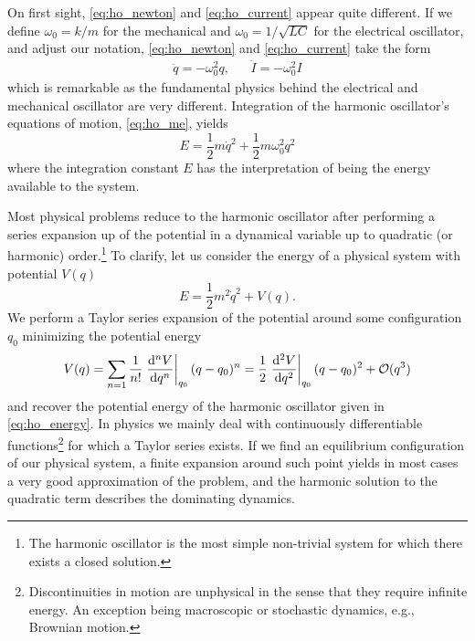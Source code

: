 On first sight, \cref{eq:ho_newton} and \cref{eq:ho_current} appear quite different.
If we define $\omega_0=k/m$ for the mechanical and $\omega_0=1/\sqrt{LC}$ for the electrical oscillator, and adjust our notation, \cref{eq:ho_newton} and \cref{eq:ho_current} take the form
\begin{align}
    \ddot{q}
    =
    -\omega_0^2q
    ,&&
    \ddot{I}
    =
    -\omega_0^2I
    \label{eq:ho_me}
\end{align}
which is remarkable as the fundamental physics behind the electrical and mechanical oscillator are very different.
Integration of the harmonic oscillator's equations of motion, \cref{eq:ho_me}, yields
\begin{equation}
    E
    =
    \frac{1}{2}m\dot{q}^2
    +
    \frac{1}{2}m\omega_0^2q^2
    \label{eq:ho_energy}
\end{equation}
where the integration constant $E$ has the interpretation of being the energy available to the system.

Most physical problems reduce to the harmonic oscillator after performing a series expansion up of the potential in a dynamical variable up to quadratic (or harmonic) order.\footnote{The harmonic oscillator is the most simple non-trivial system for which there exists a closed solution.}
To clarify, let us consider the energy of a physical system with potential $V(q)$
\begin{equation}
    E
    =
    \frac{1}{2}m^2\dot{q}^2
    +
    V(q)
    \label{eq:pp_energy}.
\end{equation}
We perform a Taylor series expansion of the potential around some configuration $q_0$ minimizing the potential energy
\begin{equation}
    V(q)
    =
    \sum_{n=1}\frac{1}{n!}\eval{\dv[n]{V}{q}}_{q_0}(q-q_0)^n
    =
    \frac{1}{2}\eval{\dv[2]{V}{q}}_{q_0}(q-q_0)^2
    +
    \mathcal{O}(q^3)
    \label{eq:pp_potential}
\end{equation}
and recover the potential energy of the harmonic oscillator given in \cref{eq:ho_energy}.
In physics we mainly deal with continuously differentiable functions\footnote{Discontinuities in motion are unphysical in the sense that they require infinite energy. An exception being macroscopic or stochastic dynamics, e.g., Brownian motion.} for which a Taylor series exists.
If we find an equilibrium configuration of our physical system, a finite expansion around such point yields in most cases a very good approximation of the problem, and the harmonic solution to the quadratic term describes the dominating dynamics.

